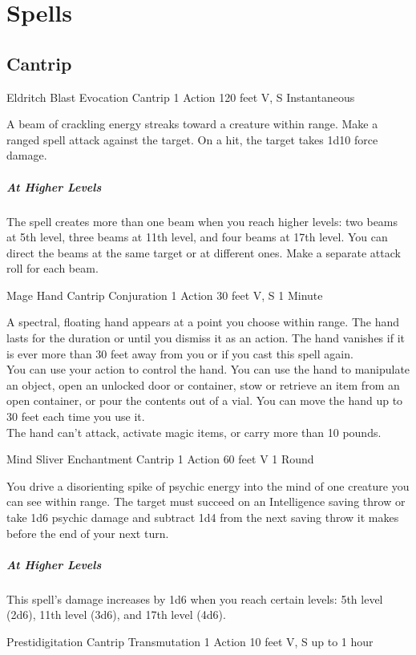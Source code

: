 \documentclass[letterpaper,openany,oneside,twocolumn]{book}
\begin{document}
\section*{Spells}
\subsection*{Cantrip}

\DndSpellHeader
  {Eldritch Blast}
  {Evocation Cantrip}
  {1 Action}
  {120 feet}
  {V, S}
  {Instantaneous}
  
A beam of crackling energy streaks toward a creature within range. Make a ranged spell attack against the target. On a hit, the target takes 1d10 force damage.

\subparagraph*{At Higher Levels} The spell creates more than one beam when you reach higher levels: two beams at 5th level, three beams at 11th level, and four beams at 17th level. You can direct the beams at the same target or at different ones. Make a separate attack roll for each beam.

\DndSpellHeader
  {Mage Hand}
  {Cantrip Conjuration}
  {1 Action}
  {30 feet}
  {V, S}
  {1 Minute}
  
A spectral, floating hand appears at a point you choose within range. The hand lasts for the duration or until you dismiss it as an action. The hand vanishes if it is ever more than 30 feet away from you or if you cast this spell again.\\
You can use your action to control the hand. You can use the hand to manipulate an object, open an unlocked door or container, stow or retrieve an item from an open container, or pour the contents out of a vial. You can move the hand up to 30 feet each time you use it.\\
The hand can't attack, activate magic items, or carry more than 10 pounds.

\DndSpellHeader
  {Mind Sliver}
  {Enchantment Cantrip}
  {1 Action}
  {60 feet}
  {V}
  {1 Round}
  
You drive a disorienting spike of psychic energy into the mind of one creature you can see within range. The target must succeed on an Intelligence saving throw or take 1d6 psychic damage and subtract 1d4 from the next saving throw it makes before the end of your next turn.

\subparagraph*{At Higher Levels} This spell's damage increases by 1d6 when you reach certain levels: 5th level (2d6), 11th level (3d6), and 17th level (4d6).

\DndSpellHeader
  {Prestidigitation}
  {Cantrip Transmutation}
  {1 Action}
  {10 feet}
  {V, S}
  {up to 1 hour}
\end{document}
